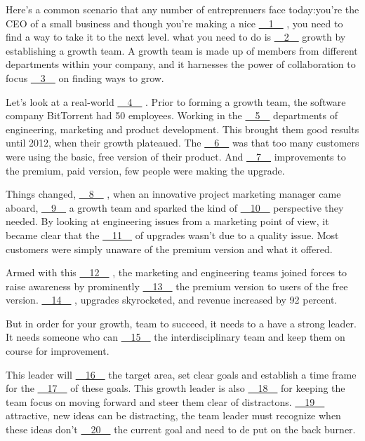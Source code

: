Here's a common scenario that any number of entreprenuers face today:you're the CEO of a small business and though you're making a nice \uline{~~1~~} , you need to find a way to take it to the next level. what you need to do is \uline{~~2~~} growth by establishing a growth team. A growth team is made up of members from different departments within your company, and it harnesses the power of collaboration to focus \uline{~~3~~} on finding ways to grow.


Let's look at a real-world \uline{~~4~~} . Prior to forming a growth team, the software company BitTorrent had 50 employees. Working in the \uline{~~5~~} departments of engineering, marketing and product development. This brought them good results until 2012, when their growth plateaued. The \uline{~~6~~} was that too many customers were using the basic, free version of their product. And \uline{~~7~~} improvements to the premium, paid version, few people were making the upgrade.


Things changed, \uline{~~8~~} , when an innovative project marketing manager came aboard, \uline{~~9~~} a growth team and sparked the kind of \uline{~~10~~} perspective they needed. By looking at engineering issues from a marketing point of view, it became clear that the \uline{~~11~~} of upgrades wasn't due to a quality issue. Most customers were simply unaware of the premium version and what it offered.


Armed with this \uline{~~12~~} , the marketing and engineering teams joined forces to raise awareness by prominently \uline{~~13~~} the premium version to users of the free version. \uline{~~14~~} , upgrades skyrocketed, and revenue increased by 92 percent.


But in order for your growth, team to succeed, it needs to a have a strong leader. It needs someone who can \uline{~~15~~} the interdisciplinary team and keep them on course for improvement.


This leader will \uline{~~16~~} the target area, set clear goals and establish a time frame for the \uline{~~17~~} of these goals. This growth leader is also \uline{~~18~~} for keeping the team focus on moving forward and steer them clear of distractons. \uline{~~19~~} attractive, new ideas can be distracting, the team leader must recognize when these ideas don't \uline{~~20~~} the current goal and need to de put on the back burner.